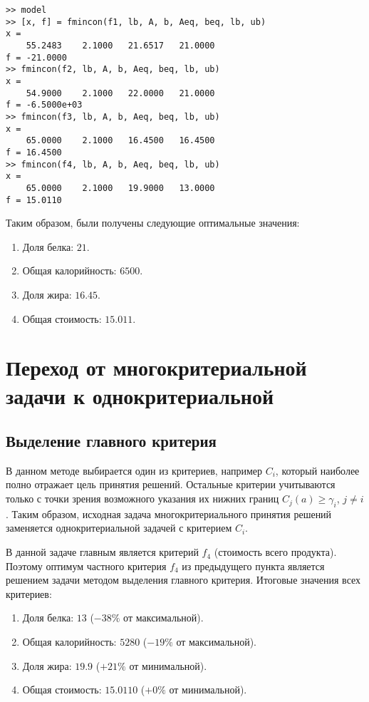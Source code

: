 

\begin{lstlisting}[caption=\code{Console}]
>> model
>> [x, f] = fmincon(f1, lb, A, b, Aeq, beq, lb, ub)
x =
	55.2483    2.1000   21.6517   21.0000
f =	-21.0000
>> fmincon(f2, lb, A, b, Aeq, beq, lb, ub)
x =
	54.9000    2.1000   22.0000   21.0000
f =	-6.5000e+03
>> fmincon(f3, lb, A, b, Aeq, beq, lb, ub)
x =
	65.0000    2.1000   16.4500   16.4500
f =	16.4500
>> fmincon(f4, lb, A, b, Aeq, beq, lb, ub)
x =
	65.0000    2.1000   19.9000   13.0000
f =	15.0110
\end{lstlisting}

Таким образом, были получены следующие оптимальные значения:

\begin{enumerate}
	\item Доля белка: $21$.
	\item Общая калорийность: $6500$.
	\item Доля жира: $16.45$.
	\item Общая стоимость: $15.011$.
\end{enumerate}

\section{Переход от многокритериальной задачи к однокритериальной}

\subsection{Выделение главного критерия}

В данном методе выбирается один из критериев, например $C_i$, который наиболее полно отражает цель принятия решений. Остальные критерии учитываются только с точки зрения возможного указания их нижних границ $C_j(a) \geq \gamma_i$, $j \neq i$. Таким образом, исходная задача многокритериального принятия решений заменяется однокритериальной задачей с критерием $C_i$.

В данной задаче главным является критерий $f_4$ (стоимость всего продукта). Поэтому оптимум частного критерия $f_4$ из предыдущего пункта является решением задачи методом выделения главного критерия. Итоговые значения всех критериев:

\begin{enumerate}
	\item Доля белка: $13$ ($-38\%$ от максимальной).
	\item Общая калорийность: $5280$ ($-19\%$ от максимальной).
	\item Доля жира: $19.9$ ($+21\%$ от минимальной).
	\item Общая стоимость: $15.0110$ ($+0\%$ от минимальной).
\end{enumerate}

